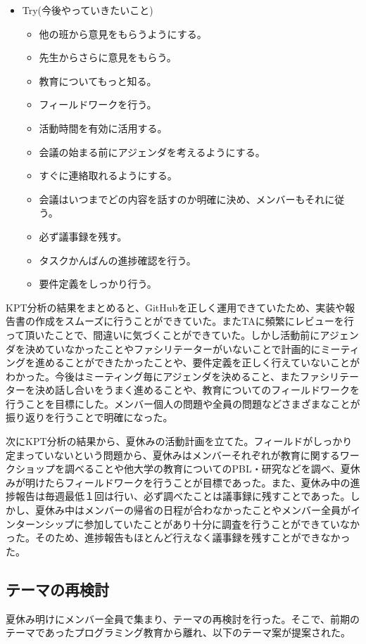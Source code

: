 \documentclass[openany,11pt,papersize]{jsbook}
\begin{document}
\begin{itemize}
\item
Try(今後やっていきたいこと)
\begin{itemize}
\item
他の班から意見をもらうようにする。
\item
先生からさらに意見をもらう。
\item
教育についてもっと知る。
\item
フィールドワークを行う。
\item
活動時間を有効に活用する。
\item
会議の始まる前にアジェンダを考えるようにする。
\item
すぐに連絡取れるようにする。
\item
会議はいつまでどの内容を話すのか明確に決め、メンバーもそれに従う。
\item
必ず議事録を残す。
\item
タスクかんばんの進捗確認を行う。
\item
要件定義をしっかり行う。
\end{itemize}

\end{itemize}

KPT分析の結果をまとめると、GitHubを正しく運用できていたため、実装や報告書の作成をスムーズに行うことができていた。またTAに頻繁にレビューを行って頂いたことで、間違いに気づくことができていた。しかし活動前にアジェンダを決めていなかったことやファシリテーターがいないことで計画的にミーティングを進めることができたかったことや、要件定義を正しく行えていないことがわかった。今後はミーティング毎にアジェンダを決めること、またファシリテーターを決め話し合いをうまく進めることや、教育についてのフィールドワークを行うことを目標にした。メンバー個人の問題や全員の問題などさまざまなことが振り返りを行うことで明確になった。

\par
次にKPT分析の結果から、夏休みの活動計画を立てた。フィールドがしっかり定まっていないという問題から、夏休みはメンバーそれぞれが教育に関するワークショップを調べることや他大学の教育についてのPBL・研究などを調べ、夏休みが明けたらフィールドワークを行うことが目標であった。また、夏休み中の進捗報告は毎週最低１回は行い、必ず調べたことは議事録に残すことであった。しかし、夏休み中はメンバーの帰省の日程が合わなかったことやメンバー全員がインターンシップに参加していたことがあり十分に調査を行うことができていなかった。そのため、進捗報告もほとんど行えなく議事録を残すことができなかった。





\subsection{テーマの再検討}
夏休み明けにメンバー全員で集まり、テーマの再検討を行った。そこで、前期のテーマであったプログラミング教育から離れ、以下のテーマ案が提案された。
\end{document}
